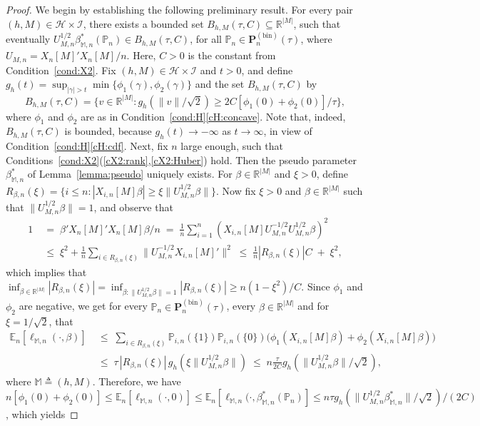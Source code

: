\documentclass[preprint]{imsart}
\newcommand{\R}{{\mathbb R}}
\newcommand{\E}{{\mathbb E}}
\renewcommand{\P}{{\mathbb P}}
\newcommand{\M}{\mathbb M}
\numberwithin{equation}{section}
\begin{document}
\begin{proof}
We begin by establishing the following preliminary result. For every pair $(h,M)\in\mathcal H\times\mathcal I$, there exists a bounded set $B_{h,M}(\tau,C)\subseteq \R^{|M|}$, such that eventually $U_{M,n}^{1/2}\beta_{\M,n}^*(\P_n)\in B_{h,M}(\tau,C)$, for all $\P_n\in\mathbf{P}_n^{(\mathrm{bin})}(\tau)$, where $U_{M,n} = X_n[M]'X_n[M]/n$. Here, $C>0$ is the constant from Condition~\ref{cond:X2}. Fix $(h,M)\in\mathcal H\times\mathcal I$ and $t>0$, and define $g_h(t) = \sup_{|\gamma|>t} \min\{\phi_1(\gamma), \phi_2(\gamma)\}$ and the set $B_{h,M}(\tau,C)$ by
$$
B_{h,M}(\tau,C) = \{ v\in\R^{|M|}: g_h(\|v\|/\sqrt{2}) \ge 2C[\phi_1(0) + \phi_2(0)]/\tau\},
$$
where $\phi_1$ and $\phi_2$ are as in Condition~\ref{cond:H}\eqref{cH:concave}. Note that, indeed, $B_{h,M}(\tau,C)$ is bounded, because $g_h(t) \to -\infty$ as $t\to\infty$, in view of Condition~\ref{cond:H}\eqref{cH:cdf}. Next, fix $n$ large enough, such that Conditions~\ref{cond:X2}(\ref{cX2:rank},\ref{cX2:Huber}) hold. Then the pseudo parameter $\beta_{\M,n}^*$ of Lemma~\ref{lemma:pseudo} uniquely exists. For $\beta\in\R^{|M|}$ and $\xi>0$, define $R_{\beta,n}(\xi) = \{ i\le n : |X_{i,n}[M]\beta|\ge \xi\|U_{M,n}^{1/2}\beta\|\}$. Now fix $\xi>0$ and $\beta\in\R^{|M|}$ such that $\|U_{M,n}^{1/2}\beta\|=1$, and observe that
\begin{align*}
1 \;&=\; \beta'X_n[M]'X_n[M]\beta/n \;=\; \frac{1}{n} \sum_{i=1}^n (X_{i,n}[M]U_{M,n}^{-1/2}U_{M,n}^{1/2}\beta)^2 \\
&\le\; \xi^2 + \frac{1}{n} \sum_{i\in R_{\beta,n}(\xi)} \|U_{M,n}^{-1/2}X_{i,n}[M]'\|^2
\;\le\;\frac{1}{n} |R_{\beta,n}(\xi)| C \;+\; \xi^2,
\end{align*}
which implies that  $\inf_{\beta\in\R^{|M|}} |R_{\beta,n}(\xi)| = \inf_{\beta:\|U_{M,n}^{1/2}\beta\|=1} |R_{\beta,n}(\xi)| \ge n(1-\xi^2)/C$. Since $\phi_1$ and $\phi_2$ are negative, we get for every $\P_n\in\mathbf{P}_n^{(\mathrm{bin})}(\tau)$, every $\beta\in\R^{|M|}$ and for $\xi=1/\sqrt{2}$, that
\begin{align*}
\E_n[\ell_{\M,n}(\cdot,\beta)] \;&\le\; \sum_{i\in R_{\beta,n}(\xi)}  \P_{i,n}(\{1\})\P_{i,n}(\{0\})  \Big( \phi_1(X_{i,n}[M]\beta) + \phi_2(X_{i,n}[M]\beta)\Big)\\
&\le \; \tau \,|R_{\beta,n}(\xi)| \,g_h(\xi\|U_{M,n}^{1/2}\beta\|) \;\le\; n \frac{\tau}{2C} g_h(\|U_{M,n}^{1/2}\beta\|/\sqrt{2}),
\end{align*}
where $\M \triangleq (h,M)$.
Therefore, we have $n[\phi_1(0) + \phi_2(0)] \le \E_n[\ell_{\M,n}(\cdot, 0)] \le \E_n[\ell_{\M,n}(\cdot, \beta_{\M,n}^*(\P_n)] \le n \tau g_h(\|U_{M,n}^{1/2}\beta_{\M,n}^*\|/\sqrt{2}) / (2C)$, which yields 

\end{proof}
\end{document}
